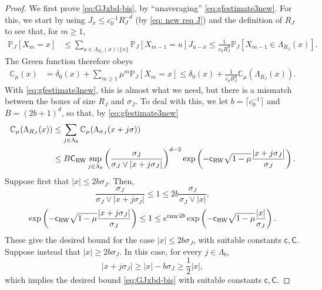 \documentclass[11pt,a4paper]{article}
\numberwithin{equation}{section}
\theoremstyle{plain}
\theoremstyle{definition}
\newcommand\1{\mathds{1}}
\newcommand\Crw{\mathsf{C}_{\textup{RW}}}
\newcommand\crw{\mathsf{c}_{\textup{RW}}}
\newcommand\CGreen{\mathsf{C}}
\newcommand\cGreen{\mathsf{c}}
\begin{document}
\begin{proof}
We first prove \eqref{eq:GJxbd-bis}, by
``unaveraging'' \eqref{eq:gfestimate3new}. For this,
we start by using $J_x\leq c_0^{-1} R_J^{-d}$ (by \eqref{eq: new req J}) and the definition of $R_J$
to see that, for $m\geq 1$,
\begin{align}
\label{eq:unav1}
    \mathbb P_J[X_{m}=x] &\leq \sum_{u\in \Lambda_{R_J}(x)\setminus\{x\}} \mathbb P_J[X_{m-1}=u]J_{u-x}
   \leq  \frac{1}{c_0R_J^d}\mathbb P_J[X_{m-1}\in \Lambda_{R_J}(x)].
\end{align}
The Green function therefore obeys
\begin{align}
    \mathbb C_\mu(x) &= \delta_{0}(x) +\sum_{m \ge 1} \mu^m \mathbb P_J[X_{m}=x]
    \le
    \delta_{0}(x)
    + \frac{1}{c_0 R_J^d} {\mathbb C}_\mu(\Lambda_{R_J}(x))
    .
\end{align}
With \eqref{eq:gfestimate3new}, this is almost what we need, but there
is a mismatch between the boxes of size $R_J$ and $\sigma_J$.
To deal with this, we let $b=\lceil c_0^{-1}\rceil$
and $B=(2b+1)^d$, so that, by \eqref{eq:gfestimate3new}
\begin{align}
    {\mathbb C}_\mu(\Lambda_{R_J}(x))
    &\le
    \sum_{j\in \Lambda_{b}}{\mathbb C}_\mu(\Lambda_{\sigma_J}(x+j\sigma))
    \\ &
    \le
    B \Crw \sup_{j\in \Lambda_{b}}
    \left(\frac{\sigma_J}{\sigma_J\vee |x+j\sigma_J|}\right)^{d-2}
    \exp\left(-\crw\sqrt{1-\mu}\frac{|x+j\sigma_J|}{\sigma_J}\right).
    \nonumber
\end{align}
Suppose first that $|x| \le 2 b\sigma_J$.  Then,
\begin{equation}
    \frac{\sigma_J}{\sigma_J\vee |x+j\sigma_J|}
    \le 1
    \le
    2b
    \frac{\sigma_J}{\sigma_J\vee |x|},
\end{equation}
\begin{equation}
    \exp\left(-\crw\sqrt{1-\mu}\frac{|x+j\sigma_J|}{\sigma_J}\right)
    \le 1
    \le
    e^{\crw 2b}
    \exp\left(-\crw\sqrt{1-\mu}\frac{|x|}{\sigma_J}\right).
\end{equation}
These give the desired bound for the case $|x| \le 2 b\sigma_J$, with suitable constants
$\cGreen,\CGreen$.
Suppose instead that $|x| \ge 2 b\sigma_J$.  In this case, for every $j\in \Lambda_b$,
\begin{equation}
    |x+j\sigma_J| \ge |x| - b\sigma_J \ge \frac 12 |x|,
\end{equation}
which implies the desired bound \eqref{eq:GJxbd-bis} with suitable constants
$\cGreen,\CGreen$.


\end{proof}
\end{document}
